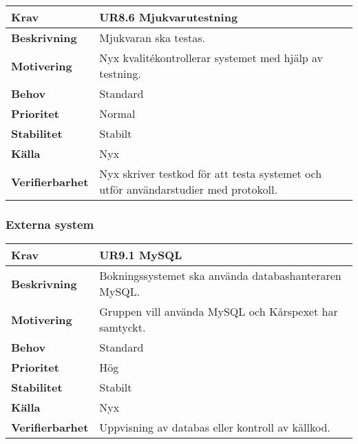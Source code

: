 \documentclass[a4paper, twoside, 11pt, titlepage]{article}
\begin{document}
		\begin {table} [ht] \begin{tabular} { p{2.6cm} p{12.5cm} }
			\hline
			{\sffamily\textbf{Krav}} & {\sffamily\textbf{UR8.6 Mjukvarutestning}} \\
			\hline
			{\sffamily\textbf{Beskrivning}} & {Mjukvaran ska testas.} \\
			\hline
			{\sffamily\textbf{Motivering}} & {Nyx kvalitékontrollerar systemet med hjälp av testning.} \\
			\hline
			{\sffamily\textbf{Behov}} & {Standard} \\
			\hline
			{\sffamily\textbf{Prioritet}} & {Normal} \\
			\hline
			{\sffamily\textbf{Stabilitet}} & {Stabilt} \\
			\hline
			{\sffamily\textbf{Källa}} & {Nyx} \\
			\hline
			{\sffamily\textbf{Verifierbarhet}} & {Nyx skriver testkod för att testa systemet och utför användarstudier med protokoll.} \\
			\hline
		\end{tabular} \end{table} \FloatBarrier


		\subsubsection{Externa system}


		\begin {table} [ht] \begin{tabular} { p{2.6cm} p{12.5cm} }
			\hline
			{\sffamily\textbf{Krav}} & {\sffamily\textbf{UR9.1 MySQL}} \\
			\hline
			{\sffamily\textbf{Beskrivning}} & {Bokningssystemet ska använda databashanteraren MySQL.} \\
			\hline
			{\sffamily\textbf{Motivering}} & {Gruppen vill använda MySQL och Kårspexet har samtyckt.} \\
			\hline
			{\sffamily\textbf{Behov}} & {Standard} \\
			\hline
			{\sffamily\textbf{Prioritet}} & {Hög} \\
			\hline
			{\sffamily\textbf{Stabilitet}} & {Stabilt} \\
			\hline
			{\sffamily\textbf{Källa}} & {Nyx} \\
			\hline
			{\sffamily\textbf{Verifierbarhet}} & {Uppvisning av databas eller kontroll av källkod.} \\
			\hline
		\end{tabular} \end{table} \FloatBarrier
		\vspace{6mm}
\end{document}

